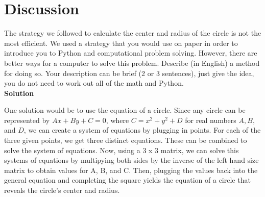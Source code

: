 \documentclass{article}
\begin{document}
\section{Discussion}
 The strategy we followed to calculate the center and radius of the circle is not the most efficient. We used a strategy that you would use on paper in order to introduce you to Python and computational problem solving. However, there are better ways for a computer to solve this problem. Describe (in English) a method for doing so. Your description can be brief (2 or 3 sentences), just give the idea, you do not need to work out all of the math and Python.
   \\
   
   \textbf{Solution}
    
    One solution would be to use the equation of a circle. Since any circle can be represented by $Ax + By + C = 0$, where $C = x^2 + y^2 + D$ for real numbers $A, B,$ and $D$, we can create a system of equations by plugging in points. For each of the three given points, we get three distinct equations. These can be combined to solve the system of equations. Now, using a 3 x 3 matrix, we can solve this systems of equations by multipying both sides by the inverse of the left hand size matrix to obtain values for A, B, and C. Then, plugging the values back into the general equation and completing the square yields the equation of a circle that reveals the circle's center and radius. 
\end{document}
